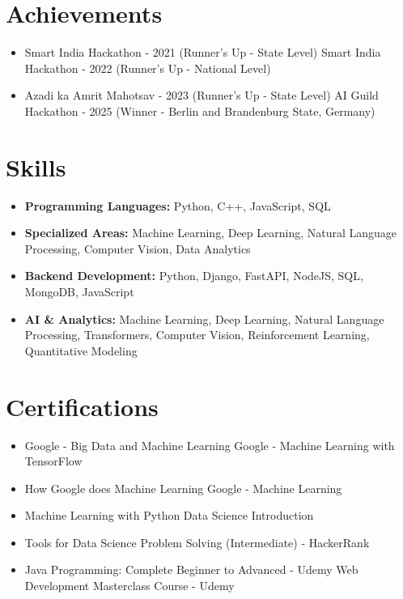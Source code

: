 \documentclass[a4paper,10pt]{article}
\begin{document}
\section*{Achievements}
\begin{itemize}
\item Smart India Hackathon - 2021 (Runner's Up - State Level) \hfill Smart India Hackathon - 2022 (Runner's Up - National Level)
\item Azadi ka Amrit Mahotsav - 2023 (Runner's Up - State Level) \hfill AI Guild Hackathon - 2025 (Winner - Berlin and Brandenburg State, Germany)
\end{itemize}

\section*{Skills}
\begin{itemize}
  \item \textbf{Programming Languages:} Python, C++, JavaScript, SQL
  \item \textbf{Specialized Areas:} Machine Learning, Deep Learning, Natural Language Processing, Computer Vision, Data Analytics
  \item \textbf{Backend Development:} Python, Django, FastAPI, NodeJS, SQL, MongoDB, JavaScript
  \item \textbf{AI \& Analytics:} Machine Learning, Deep Learning, Natural Language Processing, Transformers, Computer Vision, Reinforcement Learning, Quantitative Modeling
\end{itemize}

\section*{Certifications}
\begin{itemize}
\item Google - Big Data and Machine Learning \hfill Google - Machine Learning with TensorFlow
\item How Google does Machine Learning \hfill Google - Machine Learning
\item Machine Learning with Python \hfill Data Science Introduction
\item Tools for Data Science \hfill Problem Solving (Intermediate) - HackerRank
\item Java Programming: Complete Beginner to Advanced - Udemy \hfill Web Development Masterclass Course - Udemy
\end{itemize}
\end{document}
